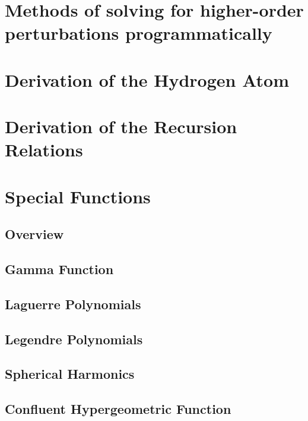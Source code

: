 \chapter{Methods of solving for higher-order perturbations programmatically} \label{sec:Program_perturbation}
\chapter{Derivation of the Hydrogen Atom}
\chapter{Derivation of the Recursion Relations}
\chapter{Special Functions}
    \section{Overview}
    \section{Gamma Function} \label{sec:Gamma_Function}
    \section{Laguerre Polynomials} \label{sec:Laguerre_Polynomial}
    \section{Legendre Polynomials} \label{sec:Legendre_Polynomial}
    \section{Spherical Harmonics}
    \section{Confluent Hypergeometric Function}